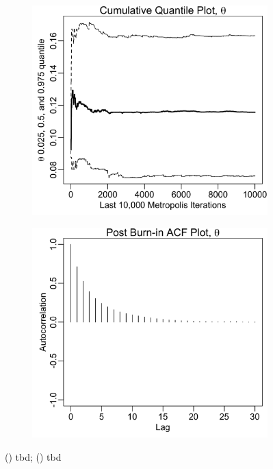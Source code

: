 \documentclass{uwstat572}
\begin{document}
\begin{figure}[H]
	\centering
	\begin{subfigure}[b]{0.49\textwidth}
		\includegraphics[width=\textwidth]{figures/mcmc_cum_quant_plot_theta.png}
		\caption{}
		\label{fig:quant_theta}
	\end{subfigure}
	\hfill
	\begin{subfigure}[b]{0.49\textwidth}
		\includegraphics[width=\textwidth]{figures/mcmc_acf_plot_theta.png}
		\caption{}
		\label{fig:acf_theta}
	\end{subfigure}
	\caption{() tbd; () tbd }
	\label{fig:data_plot}
\end{figure} 
\end{document}
